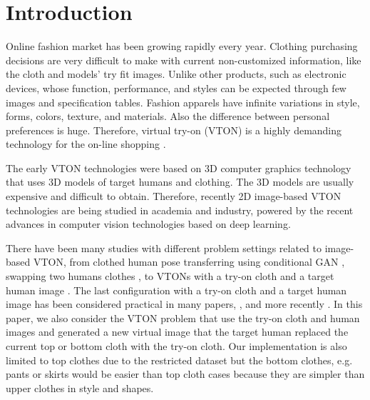 
\section{Introduction}

Online fashion market has been growing rapidly every year. Clothing purchasing decisions are very difficult to make with current non-customized information, like the cloth and models' try fit images. Unlike other products, such as electronic devices, whose function, performance, and styles can be expected through few images and specification tables. Fashion apparels have infinite variations in style, forms, colors, texture, and materials.  Also the difference between personal preferences is huge. Therefore, virtual try-on (VTON) is a highly demanding technology for the on-line shopping \cite{zhang2019role}. 

The early VTON technologies were based on 3D computer graphics technology that uses 3D models of target humans and clothing. The 3D models are usually expensive and difficult to obtain. Therefore, recently 2D image-based VTON technologies are being studied in academia and industry, powered by the recent advances in computer vision technologies based on deep learning. 

There have been many studies with different problem settings related to image-based VTON, from clothed human pose transferring using conditional GAN \cite{ma2017pose}, swapping two humans clothes \cite{jetchev2017conditional}, to VTONs with a try-on cloth and a target human image \cite{Han2017VITONAI}. The last configuration with a try-on cloth and a target human image has been considered practical in many papers, \cite{Han2017VITONAI,Wang2018TowardCI}, and more recently \cite{Sun2019ImageBasedVT,Yu_2019_ICCV,jae2019viton}. 
In this paper, we also consider the VTON problem that use the try-on cloth and human images and generated a new virtual image that the target human replaced the current top or bottom cloth with the try-on cloth. Our implementation is also limited to top clothes due to the restricted dataset but the bottom clothes, e.g. pants or skirts would be easier than top cloth cases because they are simpler than upper clothes in style and shapes.

